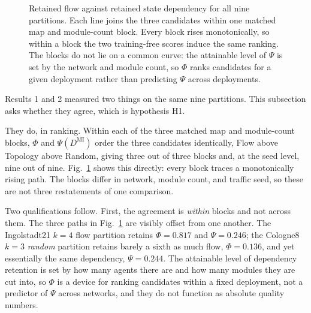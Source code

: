 \documentclass[journal]{IEEEtran}
\theoremstyle{definition}
\begin{document}
\begin{figure}[t]
    \caption{Retained flow against retained state dependency for all nine
        partitions. Each line joins the three candidates within one matched
        map and module-count block. Every block rises monotonically, so within
        a block the two training-free scores induce the same ranking. The
        blocks do not lie on a common curve: the attainable level of $\Psi$ is
        set by the network and module count, so $\Phi$ ranks candidates for a
        given deployment rather than predicting $\Psi$ across deployments.}
    \label{fig:phi-psi}
\end{figure}

Results 1 and 2 measured two things on the same nine partitions. This
subsection asks whether they agree, which is hypothesis H1.

They do, in ranking.
Within each of the three matched map and module-count blocks, $\Phi$ and
$\Psi(D^{\mathrm{MI}})$ order the three candidates identically, Flow above
Topology above Random, giving three out of three blocks and, at the seed level,
nine out of nine.
Fig.~\ref{fig:phi-psi} shows this directly: every block traces a monotonically
rising path.
The blocks differ in network, module count, and traffic seed, so these are
not three restatements of one comparison.

Two qualifications follow.
First, the agreement is \emph{within} blocks and not across them.
The three paths in Fig.~\ref{fig:phi-psi} are visibly offset from one another.
The Ingolstadt21 $k=4$ flow partition retains $\Phi=0.817$ and
$\Psi=0.246$; the Cologne8 $k=3$ \emph{random} partition retains barely a
sixth as much flow, $\Phi=0.136$, and yet essentially the same dependency,
$\Psi=0.244$.
The attainable level of dependency retention is set by how many agents there
are and how many modules they are cut into, so $\Phi$ is a device for ranking
candidates within a fixed deployment, not a predictor of $\Psi$ across
networks, and they do not function as absolute quality numbers.
\end{document}
